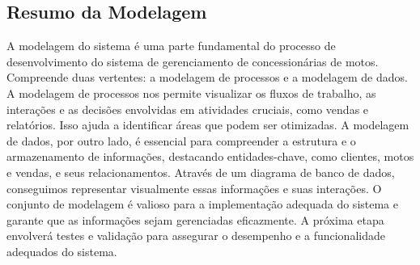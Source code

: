 \subsection{Resumo da Modelagem}

A modelagem do sistema é uma parte fundamental do processo de desenvolvimento do sistema de gerenciamento de concessionárias de motos. Compreende duas vertentes: a modelagem de processos e a modelagem de dados. A modelagem de processos nos permite visualizar os fluxos de trabalho, as interações e as decisões envolvidas em atividades cruciais, como vendas e relatórios. Isso ajuda a identificar áreas que podem ser otimizadas. A modelagem de dados, por outro lado, é essencial para compreender a estrutura e o armazenamento de informações, destacando entidades-chave, como clientes, motos e vendas, e seus relacionamentos. Através de um diagrama de banco de dados, conseguimos representar visualmente essas informações e suas interações. O conjunto de modelagem é valioso para a implementação adequada do sistema e garante que as informações sejam gerenciadas eficazmente. A próxima etapa envolverá testes e validação para assegurar o desempenho e a funcionalidade adequados do sistema.


